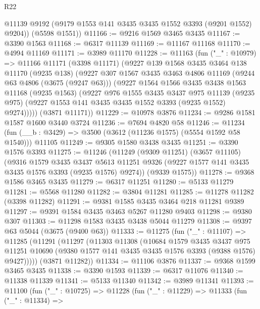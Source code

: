 \begin{lexlean}{R22}
\begin{coremodule}
        @11139
        @9192
        (@9179 @1553 @141 @3435 @3435 @1552 @3393 (@9201 @1552) @9204))
      (@5598 @1551))
@11166 := @9216 @1569 @3465 @3435
@11167 := @3390 @1563
@11168 := @6317 @11139
@11169 := @11167 @11168
@11170 := @4994 @11169
@11171 := @3989 @11170
@11228 := @11163
    (fun ("_" : @10979) =>
    @11166
      @11171
      (@3398 @11171)
      (@9227
        @139
        @1568
        @3435
        @3464
        @138
        @11170
        (@9235 @138)
        (@9227
          @307
          @1567
          @3435
          @3463
          @4806
          @11169
          (@9244 @63 @4806 (@3675 (@9247 @63)))
          (@9227
            @1564
            @1566
            @3435
            @3438
            @1563
            @11168
            (@9235 @1563)
            (@9227
              @976
              @1555
              @3435
              @3437
              @975
              @11139
              (@9235 @975)
              (@9227 @1553 @141 @3435 @3435 @1552 @3393 (@9235 @1552) @9274)))))
      (@3871 @11171))
@11229 := @10978 @3876
@11234 := @9286 @1581 @1587 @1600 @3440 @3724
@11236 := @7694 @4820 @58
@11246 := @11234 (fun (__b : @3429) => @3500 (@3612 (@11236 @1575) (@5554 @1592 @58 @1540))) @11105
@11249 := @9305 @1580 @3438 @3435
@11251 := @3390 @1576 @3393
@11275 := @11246
    (@11249
      (@9309 @11251)
      (@3657 @11105)
      (@9316
        @1579
        @3435
        @3437
        @5613
        @11251
        @9326
        (@9227 @1577 @141 @3435 @3435 @1576 @3393 (@9235 @1576) @9274))
      (@9339 @1575))
@11278 := @9368 @1586 @3465 @3435
@11279 := @6317 @11251
@11280 := @5133 @11279
@11281 := @5568 @11280
@11282 := @3804 @11281
@11285 := @11278 @11282 (@3398 @11282)
@11291 := @9381 @1585 @3435 @3464 @218 @11281 @9389
@11297 := @9391 @1584 @3435 @3463 @5267 @11280 @9403
@11298 := @9380 @307
@11303 := @11298 @1583 @3435 @3438 @5044 @11279
@11308 := @9397 @63 @5044 (@3675 (@9400 @63))
@11333 := @11275
    (fun ("_" : @11107) =>
    @11285
      (@11291
        (@11297
          (@11303
            @11308
            (@10684
              @1579
              @3435
              @3437
              @975
              @11251
              @10690
              (@9380 @1577 @141 @3435 @3435 @1576 @3393 (@9388 @1576) @9427)))))
      (@3871 @11282))
@11334 := @11106 @3876
@11337 := @9368 @1599 @3465 @3435
@11338 := @3390 @1593
@11339 := @6317 @11076
@11340 := @11338 @11339
@11341 := @5133 @11340
@11342 := @3989 @11341
@11393 := @11100
    (fun ("_" : @10725) =>
    @11228
      (fun ("_" : @11229) =>
      @11333
        (fun ("_" : @11334) =>

\end{coremodule}
\end{lexlean}
